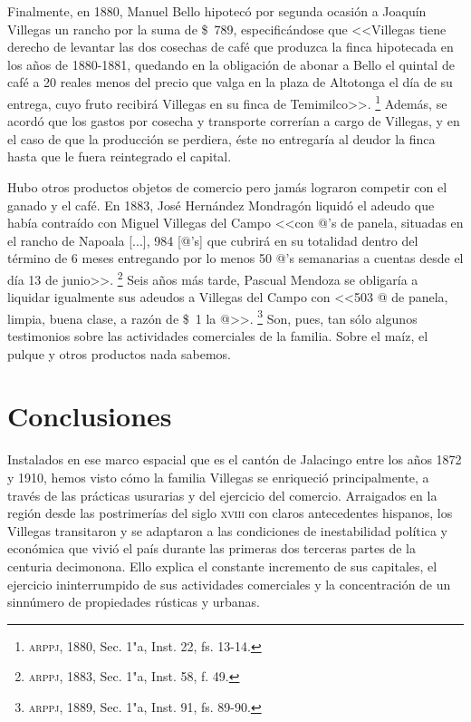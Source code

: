 \documentclass[14pt,twoside,final]{extbook} %
\let\oldfootnote\footnote
\renewcommand\footnote[1]{%
\oldfootnote{\hspace{1mm}#1}}
\begin{document}
Finalmente, en 1880, Manuel Bello hipotecó por segunda ocasión a Joaquín Villegas un rancho por la suma de \$~789, especificándose que <<Villegas tiene derecho de levantar las dos cosechas de café que produzca la finca hipotecada en los años de 1880-1881, quedando en la obligación de abonar a Bello el quintal de café a 20 reales menos del precio que valga en la plaza de Altotonga el día de su entrega, cuyo fruto recibirá Villegas en su finca de Temimilco>>.\footnote{\textsc{arppj}, 1880, Sec. 1"a, Inst. 22, fs. 13-14.} Además, se acordó que los gastos por cosecha y transporte correrían a cargo de Villegas, y en el caso de que la producción se perdiera, éste no entregaría al deudor la finca hasta que le fuera reintegrado el capital.

Hubo otros productos objetos de comercio pero jamás lograron competir con el ganado y el café. En 1883, José Hernández Mondragón liquidó el adeudo que había contraído con Miguel Villegas del Campo <<con @'s de panela, situadas en el rancho de Napoala [...], 984 [@'s] que cubrirá en su totalidad dentro del término de 6 meses entregando por lo menos 50 @'s semanarias a cuentas desde el día 13 de junio>>.\footnote{\textsc{arppj}, 1883, Sec. 1"a, Inst. 58, f. 49.} Seis años más tarde, Pascual Mendoza se obligaría a liquidar igualmente sus adeudos a Villegas del Campo con <<503 @ de panela, limpia, buena clase, a razón de \$~1 la @>>.\footnote{\textsc{arppj}, 1889, Sec. 1"a, Inst. 91, fs. 89-90.} Son, pues, tan sólo algunos testimonios sobre las actividades comerciales de la familia. Sobre el maíz, el pulque y otros productos nada sabemos.
\chapter*{Conclusiones}\label{ch:conclusiones}
\thispagestyle{empty}
\pagestyle{fancy}
\fancyhf{} %
\fancyhead[RO,LE]{\iffloatpage{}{\thepage}}
\renewcommand\headrulewidth{\iffloatpage{0pt}{0pt}}
\setcounter{page}{127}
Instalados en ese marco espacial que es el cantón de Jalacingo entre los años 1872 y 1910, hemos visto cómo la familia Villegas se enriqueció principalmente, a través de las prácticas usurarias y del ejercicio del comercio. Arraigados en la región desde las postrimerías del siglo \textsc{xviii} con claros antecedentes hispanos, los Villegas transitaron y se adaptaron a las condiciones de inestabilidad política y económica que vivió el país durante las primeras dos terceras partes de la
centuria decimonona. Ello explica el constante incremento de sus capitales, el ejercicio ininterrumpido de sus actividades comerciales y la concentración de un sinnúmero de propiedades rústicas y urbanas.
\end{document}
